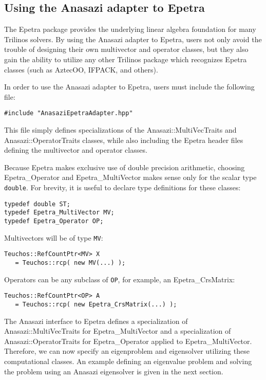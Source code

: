 \subsection{Using the Anasazi adapter to Epetra}
\label{sec:anasazi:epetra}

The Epetra package provides the underlying linear algebra foundation for many
Trilinos solvers.  By using the Anasazi adapter to Epetra, users not only
avoid the trouble of designing their own multivector and operator classes, but
they also gain the ability to utilize any other Trilinos package which
recognizes Epetra classes (such as AztecOO, IFPACK, and others).

In order to use the Anasazi adapter to Epetra, users must include the following
file:
\begin{verbatim}
#include "AnasaziEpetraAdapter.hpp"
\end{verbatim}
This file simply defines specializations of the Anasazi::MultiVecTraits
and Anasazi::OperatorTraits classes, while also including the Epetra
header files defining the multivector and operator classes.

Because Epetra makes exclusive use of double precision arithmetic, choosing
Epetra\_Operator and Epetra\_MultiVector makes sense only for the
scalar type \verb!double!. For brevity, it is useful to declare type definitions
for these classes:
\begin{verbatim}
typedef double ST;
typedef Epetra_MultiVector MV;
typedef Epetra_Operator OP;
\end{verbatim}

\noindent Multivectors will be of type \verb!MV!:
\begin{verbatim}
Teuchos::RefCountPtr<MV> X 
   = Teuchos::rcp( new MV(...) );
\end{verbatim}

\noindent Operators can be any subclass of \verb!OP!, for example, an Epetra\_CrsMatrix:
\begin{verbatim}
Teuchos::RefCountPtr<OP> A 
   = Teuchos::rcp( new Epetra_CrsMatrix(...) );
\end{verbatim}

The Anasazi interface to Epetra defines a specialization of
Anasazi::MultiVecTraits for Epetra\_MultiVector and a
specialization of Anasazi::OperatorTraits for Epetra\_Operator
applied to Epetra\_MultiVector. Therefore, we can now specify an
eigenproblem and eigensolver utilizing these computational classes. An example
defining an eigenvalue problem and solving the problem using an Anasazi
eigensolver is given in the next section.

